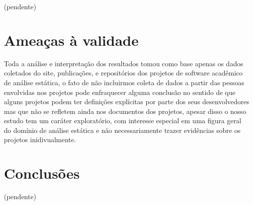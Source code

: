 (pendente)

\section{Ameaças à validade}

Toda a análise e interpretação dos resultados tomou como base apenas os dados
coletados do site, publicações, e repositórios dos projetos de software
acadêmico de análise estática, o fato de não incluirmos coleta de dados a
partir das pessoas envolvidas nos projetos pode enfraquecer alguma conclusão no
sentido de que alguns projetos podem ter definições explícitas por parte dos
seus desenvolvedores mas que não se refletem ainda nos documentos dos projetos,
apesar disso o nosso estudo tem um caráter exploratório, com interesse especial em
uma figura geral do domínio de análise estática e não necessariamente trazer
evidências sobre os projetos inidivualmente.

\section{Conclusões} \label{estudo3:conclusoes}

(pendente)




